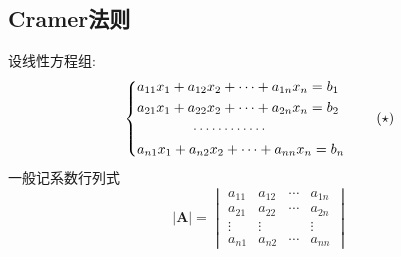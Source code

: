 \subsection{Cramer法则}
设线性方程组:
\[
    \left\{
    \begin{lgathered}
        a_{11}x_1 + a_{12}x_2 + \cdots +a_{1n}x_n = b_1\\
        a_{21}x_1 + a_{22}x_2 + \cdots +a_{2n}x_n = b_2\\
        \qquad\qquad\cdots\cdots\cdots\cdots\\
        a_{n1}x_1 + a_{n2}x_2 + \cdots +a_{nn}x_n = b_n
    \end{lgathered}
    \right.\tag{$\star$}
\]
一般记系数行列式
\[
    \left|\bm{A}\right|=\begin{vmatrix}
        a_{11} & a_{12} & \cdots & a_{1n} \\
        a_{21} & a_{22} & \cdots & a_{2n} \\
        \vdots & \vdots &        & \vdots \\
        a_{n1} & a_{n2} & \cdots & a_{nn}
    \end{vmatrix}
\]
